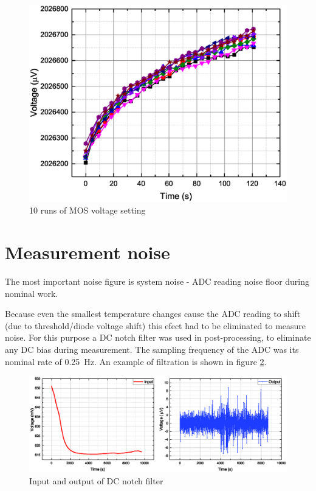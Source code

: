     \begin{figure}[H]
        \centering
        \includegraphics[width=0.8\paperwidth]{img/07/MOS_settling.eps}
        \caption{10 runs of MOS voltage setting}
        \label{MOS_settling}
    \end{figure}

\section{Measurement noise}
    The most important noise figure is system noise - ADC reading noise floor during nominal work.

    Because even the smallest temperature changes cause the ADC reading to shift (due to threshold/diode voltage shift) this efect had to be eliminated to measure noise. For this purpose a DC notch filter was used in post-processing, to eliminate any DC bias during measurement. The sampling frequency of the ADC was its nominal rate of \SI{0.25}{\hertz}. An example of filtration is shown in figure \ref{notch_DC_example}.

    \begin{figure}[H]
        \centering
        \includegraphics[width=0.8\paperwidth]{img/07/filterBeforeAfter.eps}
        \caption{Input and output of DC notch filter}
        \label{notch_DC_example}
    \end{figure}

